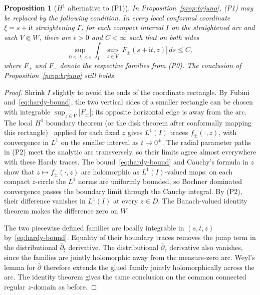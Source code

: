 \documentclass[11pt]{amsart}
\newtheorem{proposition}[theorem]{Proposition}
\theoremstyle{definition}
\newcommand{\ii}{\mathrm{i}}
\begin{document}
\begin{proposition}[$H^1$ alternative to (P1)]
\label{prop:hardy-reduction}
In Proposition~\ref{prop:brjuno}, (P1) may be replaced by the following
condition.  In every local conformal coordinate $\xi=s+\ii t$ straightening
$\Gamma$, for each compact interval $I$ on the straightened arc and each
$V\Subset W$, there are $\epsilon>0$ and $C<\infty$ such that
on both sides
\begin{equation}\label{eq:hardy-bound}
 \sup_{0<|t|<\epsilon}\int_I
 \sup_{z\in V}|F_\pm(s+\ii t,z)|\,ds\le C,
\end{equation}
where $F_+$ and $F_-$ denote the respective families from (P0).
The conclusion of Proposition~\ref{prop:brjuno} still holds.
\end{proposition}

\begin{proof}
Shrink $I$ slightly to avoid the ends of the coordinate rectangle.
By Fubini and~\eqref{eq:hardy-bound}, the two vertical sides of a smaller
rectangle can be chosen with integrable $\sup_{z\in V}|F_\pm|$; its
opposite horizontal edge is away from the arc.  The local $H^1$ boundary theorem
(or the disk theorem after conformally mapping this rectangle)~\cite{Duren1970}
applied for each fixed $z$ gives
$L^1(I)$ traces $f_\pm(\cdot,z)$, with convergence in $L^1$ on the
smaller interval as $t\to0^\pm$.  The radial parameter paths in (P2)
meet the analytic arc transversely, so their limits agree almost everywhere
with these Hardy traces.  The bound~\eqref{eq:hardy-bound}
and Cauchy's formula in $z$ show that
$z\mapsto f_\pm(\cdot,z)$ are holomorphic as $L^1(I)$-valued maps:
on each compact $z$-circle the $L^1$ norms are uniformly bounded, so
Bochner dominated convergence passes the boundary limit through the
Cauchy integral.
By (P2), their difference vanishes in $L^1(I)$ at every $z\in D$.
The Banach-valued identity theorem makes the difference zero on $W$.

The two piecewise defined families are locally integrable in $(s,t,z)$
by~\eqref{eq:hardy-bound}.  Equality of their boundary traces removes
the jump term in the distributional $\bar\partial_\xi$ derivative.
The distributional $\bar\partial_z$ derivative also vanishes, since the
families are jointly holomorphic away from the measure-zero arc.
Weyl's lemma for $\bar\partial$ therefore extends the glued family
jointly holomorphically across the arc.  The identity theorem gives the
same conclusion on the common connected regular $z$-domain as before.
\end{proof}
\end{document}
